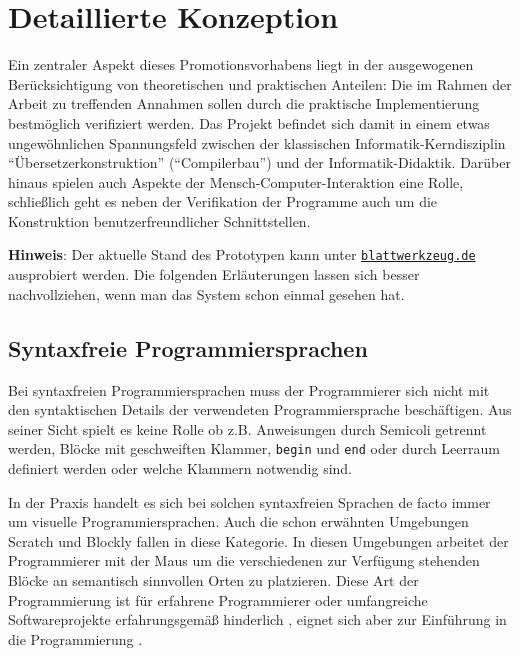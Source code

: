 \documentclass[paper=a4,fontsize=12pt,parskip=half]{scrartcl}
\begin{document}
\section{Detaillierte Konzeption}

Ein zentraler Aspekt dieses Promotionsvorhabens liegt in der ausgewogenen Berücksichtigung von theoretischen und praktischen Anteilen: Die im Rahmen der Arbeit zu treffenden Annahmen sollen durch die praktische Implementierung bestmöglich verifiziert werden. Das Projekt befindet sich damit in einem etwas ungewöhnlichen Spannungsfeld zwischen der klassischen Informatik-Kerndisziplin \enquote{Übersetzerkonstruktion} (\enquote{Compilerbau}) und der Informatik-Didaktik. Darüber hinaus spielen auch Aspekte der Mensch-Computer-Interaktion eine Rolle, schließlich geht es neben der Verifikation der Programme auch um die Konstruktion benutzerfreundlicher Schnittstellen.

\begin{framed}
  \textbf{Hinweis}: Der aktuelle Stand des Prototypen kann unter \href{https://blattwerkzeug.de}{\texttt{blattwerkzeug.de}} ausprobiert werden. Die folgenden Erläuterungen lassen sich besser nachvollziehen, wenn man das System schon einmal gesehen hat.
\end{framed}

\subsection{Syntaxfreie Programmiersprachen}

Bei syntaxfreien Programmiersprachen muss der Programmierer sich nicht mit den syntaktischen Details der verwendeten Programmiersprache beschäftigen. Aus seiner Sicht spielt es keine Rolle ob z.B. Anweisungen durch Semicoli getrennt werden, Blöcke mit geschweiften Klammer, \texttt{begin} und \texttt{end} oder durch Leerraum definiert werden oder welche Klammern notwendig sind.

In der Praxis handelt es sich bei solchen syntaxfreien Sprachen de facto immer um visuelle Programmiersprachen. Auch die schon erwähnten Umgebungen Scratch und Blockly fallen in diese Kategorie. In diesen Umgebungen arbeitet der Programmierer mit der Maus um die verschiedenen zur Verfügung stehenden Blöcke an semantisch sinnvollen Orten zu platzieren. Diese Art der Programmierung ist für erfahrene Programmierer oder umfangreiche Softwareprojekte erfahrungsgemäß hinderlich \cite[S. 262f]{schiffer_visuelle_2001}, eignet sich aber zur Einführung in die Programmierung \cite{resnick_scratch:_2009}.
\end{document}
